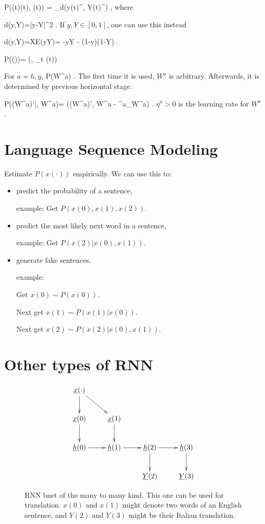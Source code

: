 \beq\color{blue}
P(\cale(t)\cond \vecy(t), (t))
=
\sum_\sigma d(y(t)^\s, Y(t)^\s)
\;,
\eeq
where 

\beq
d(y,Y)=|y-Y|^2
\;.
\label{eq-d-err-sq}
\eeq
If $y, Y\in [0,1]$, 
one can use this instead

\beq
d(y,Y)=XE(y\rarrow Y)=
-y\ln Y - (1-y)\ln (1-Y)
\;.
\eeq

\beq\color{blue}
P(\cale\cond \cale(\cdot))=
\delta(\cale, \sum_t \cale(t))
\eeq

For $a=h,y$,
\beq\color{blue}
P(W^a)
\;.
\eeq
The first time it is used,
$W^a$ is arbitrary. Afterwards,
it is determined by previous 
horizontal
stage.

\beq\color{blue}
P((W^a)'|\cale, W^a)=
\delta((W^a)', W^a -
\eta ^a\partial_{W^a}\cale)
\;.
\eeq
$\eta ^a>0$ is the learning rate
for $W^a$.

\section{Language Sequence Modeling}

Estimate $P(x(\cdot))$ 
empirically.
We can use this to: 
\begin{itemize}
\item
predict the probability 
of a sentence,

example: Get $P(x(0), x(1), x(2))$.
\item
predict 
the most likely 
next word in a sentence,

example: Get $P(x(2)| x(0), x(1))$.
\item generate fake sentences.

example: 

Get $x(0)\sim P(x(0))$.

Next get $x(1)\sim P(x(1)|x(0))$.

Next get $x(2)\sim P(x(2)|x(0), x(1))$.


\end{itemize}

 
\section{Other types of RNN}

\begin{figure}[h!]
\centering
$$\xymatrix{
\rvx(\cdot)\ar[d]\ar[dr]\\
\rvx(0)\ar[d]&
\rvx(1)\ar[d]&
\\
\rvh(0)\ar[r]&
\rvh(1)\ar[r]&
\rvh(2)\ar[d]\ar[r]&
\rvh(3)\ar[d]\\
&
&
\rvY(2)&
\rvY(3)
}$$
\caption{RNN bnet of the
many to many kind. This
one can be used for  translation.
$x(0)$ and $x(1)$ might
denote two words of an English
sentence, and $Y(2)$ 
and $Y(3)$ might be
their Italian translation.}
\label{fig-rnn-translation}
\end{figure}

